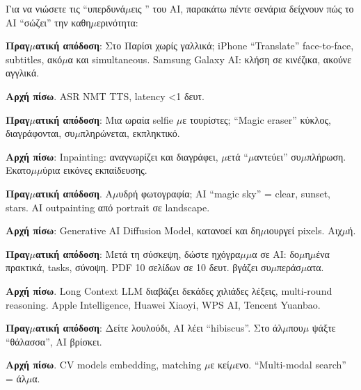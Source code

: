 
Για να νιώσετε τις “υπερδυνά$\mu$εις ” του AI, παρακάτω πέντε σενάρια δείχνουν πώς το AI “σώζει” την καθη$\mu$ερινότητα:


\textbf{Πραγ$\mu$ατική απόδοση}: Στο Παρίσι χωρίς γαλλικά; iPhone “Translate” face-to-face, subtitles, ακό$\mu$α και simultaneous. Samsung Galaxy AI: κλήση σε κινέζικα, ακούνε αγγλικά.

\textbf{Αρχή πίσω}. ASR NMT TTS, latency <1 δευτ.


\textbf{Πραγ$\mu$ατική απόδοση}: Μια ωραία selfie $\mu$ε τουρίστες; “Magic eraser” κύκλος, διαγράφονται, συ$\mu$πληρώνεται, εκπληκτικό.

\textbf{Αρχή πίσω}: Inpainting: αναγνωρίζει και διαγράφει, $\mu$ετά “$\mu$αντεύει” συ$\mu$πλήρωση. Εκατο$\mu$$\mu$ύρια εικόνες εκπαίδευσης.


\textbf{Πραγ$\mu$ατική απόδοση}. Α$\mu$υδρή φωτογραφία; AI “magic sky” = clear, sunset, stars. AI outpainting από portrait σε landscape.

\textbf{Αρχή πίσω}: Generative AI Diffusion Model, κατανοεί και δη$\mu$ιουργεί pixels. Αιχ$\mu$ή.


\textbf{Πραγ$\mu$ατική απόδοση}: Μετά τη σύσκεψη, δώστε ηχόγρα$\mu$$\mu$α σε AI: δο$\mu$η$\mu$ένα πρακτικά, tasks, σύνοψη. PDF 10 σελίδων σε 10 δευτ. βγάζει συ$\mu$περάσ$\mu$ατα.

\textbf{Αρχή πίσω}. Long Context LLM διαβάζει δεκάδες χιλιάδες λέξεις, multi-round reasoning. Apple Intelligence, Huawei Xiaoyi, WPS AI, Tencent Yuanbao.


\textbf{Πραγ$\mu$ατική απόδοση}: Δείτε λουλούδι, AI λέει “hibiscus”. Στο άλ$\mu$που$\mu$ ψάξτε “θάλασσα”, AI βρίσκει.

\textbf{Αρχή πίσω}. CV models embedding, matching $\mu$ε κεί$\mu$ενο. “Multi-modal search” = άλ$\mu$α.

